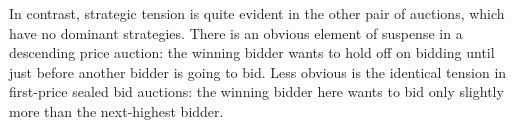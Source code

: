 In contrast, strategic tension is quite evident in the other pair of auctions, which have no dominant strategies. There is an obvious element of suspense in a descending price auction: the winning bidder wants to hold off on bidding until just before another bidder is going to bid. Less obvious is the identical tension in first-price sealed bid auctions: the winning bidder here wants to bid only slightly more than the next-highest bidder.



\begin{comment}

Let's take a closer look at the ascending-price (English) auction. The strategy for each bidder is simple: just figure out the ``stop price" at which you're no longer willing to continue bidding. If we could see all the bidders' stop prices, we could anticipate the outcome of the auction: the bidder with the highest stop price would win, and would pay an amount just slightly above the second-highest stop price. (The bids would go higher and higher until only two bidders were left, and when one of them stops the auction ends.) Indeed, an auctioneer tiring of an ascending price auction might just ask the bidders to write down their stop prices and then award the item to the highest bidder and charge the second-highest stop price.

But this is exactly what happens in a second-price sealed-bid auction! So the ascending-price auction and the second-price sealed-bid auction are equivalent. For further evidence of this, Figure~\ref{fig:proxybidding} duplicates the \href{http://pages.ebay.com/help/buyerguide/bidding-prxy.html}{online}\footnote{http://pages.ebay.com/help/buyerguide/bidding-prxy.html} description of the Proxy Bidding feature on the auction house eBay, which runs ascending-price auctions. Note that Proxy Bidding effectively turns ascending-price auctions into second-price sealed-bid auctions!

Next, let's look at the descending price (Dutch) auction. Since such an auction ends as soon as one bidder calls out ``Mine!", the strategy for each bidder is simply to determine his or her ``call-out price". If we could see all the bidders' call-out prices, we could anticipate the outcome of the auction: the bidder with the highest call-out price would win, and would pay his or her call-out price. Indeed, an auctioneer tiring of a descending price auction might just ask the bidders to write down their call-out prices and then award the item to the highest bidder and charge the highest call-out price. But this is exactly what happens in a first-price sealed-bid auction! So the descending-price auction and the first-price sealed-bid auction are equivalent, and the four auctions we began with have now been reduced to two. We can now return to one of our earlier questions:

\end{comment}




